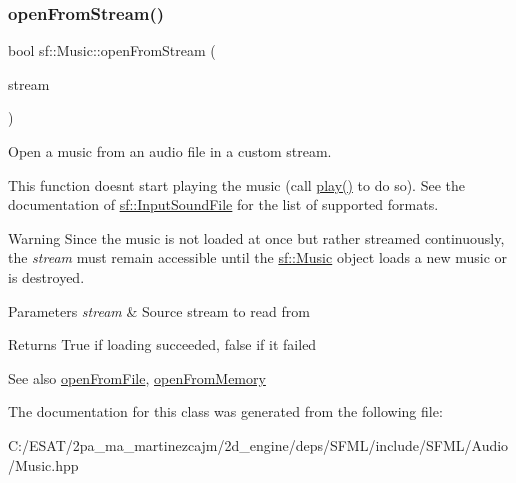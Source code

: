 \subsubsection{\texorpdfstring{open\+From\+Stream()}{openFromStream()}}
{\footnotesize\ttfamily bool sf\+::\+Music\+::open\+From\+Stream (\begin{DoxyParamCaption}\item[{\hyperlink{classsf_1_1_input_stream}{Input\+Stream} \&}]{stream }\end{DoxyParamCaption})}



Open a music from an audio file in a custom stream. 

This function doesn\textquotesingle{}t start playing the music (call \hyperlink{classsf_1_1_sound_stream_afdc08b69cab5f243d9324940a85a1144}{play()} to do so). See the documentation of \hyperlink{classsf_1_1_input_sound_file}{sf\+::\+Input\+Sound\+File} for the list of supported formats.

\begin{DoxyWarning}{Warning}
Since the music is not loaded at once but rather streamed continuously, the {\itshape stream} must remain accessible until the \hyperlink{classsf_1_1_music}{sf\+::\+Music} object loads a new music or is destroyed.
\end{DoxyWarning}

\begin{DoxyParams}{Parameters}
{\em stream} & Source stream to read from\\
\hline
\end{DoxyParams}
\begin{DoxyReturn}{Returns}
True if loading succeeded, false if it failed
\end{DoxyReturn}
\begin{DoxySeeAlso}{See also}
\hyperlink{classsf_1_1_music_a3edc66e5f5b3f11e84b90eaec9c7d7c0}{open\+From\+File}, \hyperlink{classsf_1_1_music_ae93b21bcf28ff0b5fec458039111386e}{open\+From\+Memory} 
\end{DoxySeeAlso}


The documentation for this class was generated from the following file\+:\begin{DoxyCompactItemize}
\item 
C\+:/\+E\+S\+A\+T/2pa\+\_\+ma\+\_\+martinezcajm/2d\+\_\+engine/deps/\+S\+F\+M\+L/include/\+S\+F\+M\+L/\+Audio/Music.\+hpp\end{DoxyCompactItemize}
